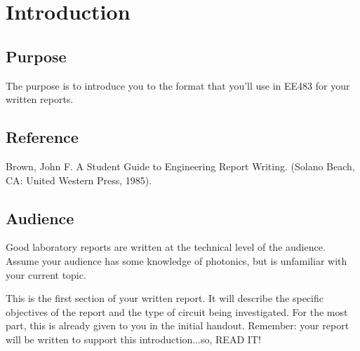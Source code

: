 \section{Introduction}

	\subsection{Purpose}
	The purpose is to introduce you to the format that you’ll use in EE483 for your written reports.
	
	\subsection{Reference}
	Brown, John F.  A Student Guide to Engineering Report Writing.  (Solano Beach, CA: United Western Press, 1985).
	
	\subsection{Audience}
	Good laboratory reports are written at the technical level of the audience.  Assume your audience has some knowledge of photonics, but is unfamiliar with your current topic.
	
	\bigskip
	This is the first section of your written report.  It will describe the specific objectives of the report and the type of circuit being investigated.  For the most part, this is already given to you in the initial handout.  Remember: your report will be written to support this introduction...so, READ IT!